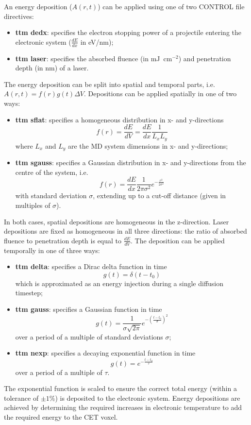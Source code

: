 An energy deposition 
($A(r,t)$) can be applied using one of two CONTROL file directives:
\begin{itemize}
\item {\bf ttm dedx}: specifies the electron stopping power of a projectile entering the electronic system ($\frac{dE}{dx}$ in eV/nm);
\item {\bf ttm laser}: specifies the absorbed fluence (in mJ~cm$^{-2}$) and penetration depth (in nm) of a laser.
\end{itemize}
The energy deposition can be split into spatial and temporal parts, i.e.
$A(r,t) = f(r) g(t) \Delta V$. Depositions can be applied spatially in one of two ways:
\begin{itemize}
\item {\bf ttm sflat}: specifies a homogeneous distribution in x- and y-directions \begin{equation*}f(r) = \frac{dE}{dV} = \frac{dE}{dx} \frac{1}{L_{x} L_{y}}\end{equation*} where $L_{x}$ and $L_{y}$ are the MD system dimensions in x- and y-directions;
\item {\bf ttm sgauss}: specifies a Gaussian distribution in x- and y-directions from the centre of the system, i.e.\begin{equation*}f(r) = \frac{dE}{dx} \frac{1}{2 \pi \sigma^2} e^{-\frac{r^2}{2\sigma^2}}\end{equation*} with standard deviation $\sigma$, extending up to a cut-off distance (given in multiples of $\sigma$).
\end{itemize}
In both cases, spatial depositions are homogeneous in the z-direction. 
Laser depositions are fixed as homogeneous in all three directions: the 
ratio of absorbed fluence to penetration depth is equal to $\frac{dE}{dV}$.
The deposition can be applied temporally in one of three ways:
\begin{itemize}
\item {\bf ttm delta}: specifies a Dirac delta function in time \begin{equation*} g(t) = \delta (t - t_0) \end{equation*} which is approximated as an energy injection during a single diffusion timestep;
\item {\bf ttm gauss}: specifies a Gaussian function in time \begin{equation*} g(t) = \frac{1}{\sigma\sqrt{2\pi}}e^{-\left(\frac{t-t_0}{\sigma}\right)^2} \end{equation*} over a period of a multiple of standard deviations $\sigma$;
\item {\bf ttm nexp}: specifies a decaying exponential function in time \begin{equation*} g(t) = e^{-\frac{t-t_0}{\tau}} \end{equation*} over a period of a multiple of $\tau$.
\end{itemize}
The exponential function is scaled to ensure the correct total energy 
(within a tolerance of $\pm 1$\%) is deposited to the electronic system. 
Energy depositions are achieved by determining the required increases 
in electronic temperature to add the required energy to the CET voxel.

